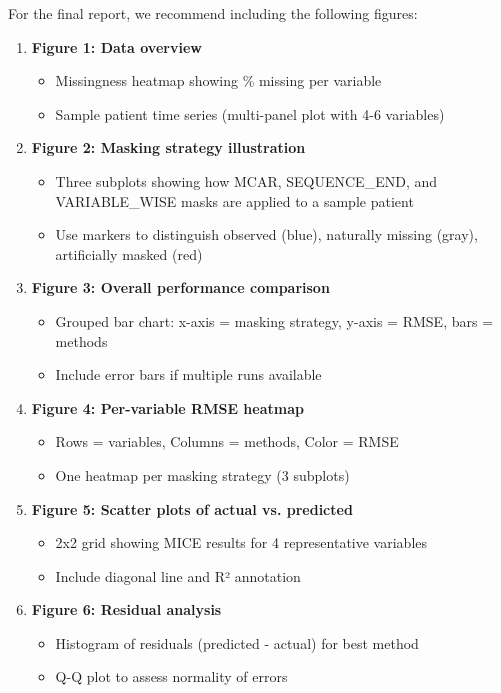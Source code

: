 \documentclass[11pt]{article}
\begin{document}
For the final report, we recommend including the following figures:

\begin{enumerate}[noitemsep]
    \item \textbf{Figure 1: Data overview}
    \begin{itemize}[noitemsep]
        \item Missingness heatmap showing \% missing per variable
        \item Sample patient time series (multi-panel plot with 4-6 variables)
    \end{itemize}

    \item \textbf{Figure 2: Masking strategy illustration}
    \begin{itemize}[noitemsep]
        \item Three subplots showing how MCAR, SEQUENCE\_END, and VARIABLE\_WISE masks are applied to a sample patient
        \item Use markers to distinguish observed (blue), naturally missing (gray), artificially masked (red)
    \end{itemize}

    \item \textbf{Figure 3: Overall performance comparison}
    \begin{itemize}[noitemsep]
        \item Grouped bar chart: x-axis = masking strategy, y-axis = RMSE, bars = methods
        \item Include error bars if multiple runs available
    \end{itemize}

    \item \textbf{Figure 4: Per-variable RMSE heatmap}
    \begin{itemize}[noitemsep]
        \item Rows = variables, Columns = methods, Color = RMSE
        \item One heatmap per masking strategy (3 subplots)
    \end{itemize}

    \item \textbf{Figure 5: Scatter plots of actual vs. predicted}
    \begin{itemize}[noitemsep]
        \item 2x2 grid showing MICE results for 4 representative variables
        \item Include diagonal line and R² annotation
    \end{itemize}

    \item \textbf{Figure 6: Residual analysis}
    \begin{itemize}[noitemsep]
        \item Histogram of residuals (predicted - actual) for best method
        \item Q-Q plot to assess normality of errors
    \end{itemize}
\end{enumerate}
\end{document}
